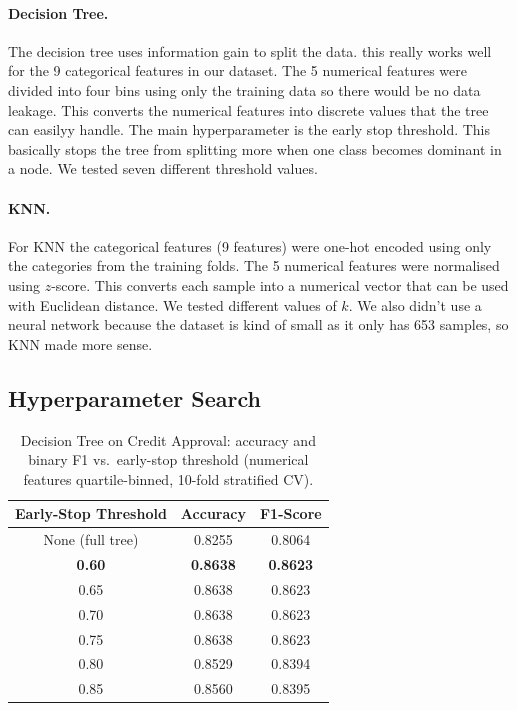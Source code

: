 \documentclass[11pt,letterpaper]{article}
\begin{document}
\paragraph{Decision Tree.}
The decision tree uses information gain to split the data. this really works well
for the 9 categorical features in our dataset. The 5 numerical features
were divided into four bins using only the training data so there would be
no data leakage. This converts the numerical features into discrete values
that the tree can easilyy handle. The main hyperparameter is the early stop
threshold. This basically  stops the tree from splitting more when one class becomes
dominant in a node. We tested seven different threshold values.

\paragraph{KNN.}
For KNN the categorical features (9 features) were one-hot encoded using only the
categories from the training folds. The 5 numerical features were
normalised using $z$-score. This converts each sample into a numerical vector that can be used with Euclidean distance. We tested
different values of $k$. We also didn't use a neural network because
the dataset is kind of small as it only has 653 samples, so KNN made more sense.

\subsection{Hyperparameter Search}

\begin{table}[ht]
\centering
\caption{Decision Tree on Credit Approval: accuracy and binary F1 vs.\
         early-stop threshold (numerical features quartile-binned,
         10-fold stratified CV).}
\label{tab:d4_dt}
\begin{tabular}{@{}ccc@{}}
\toprule
Early-Stop Threshold & Accuracy & F1-Score \\
\midrule
None (full tree) & 0.8255 & 0.8064 \\
\rowcolor{hilight}
\textbf{0.60} & \textbf{0.8638} & \textbf{0.8623} \\
0.65 & 0.8638 & 0.8623 \\
0.70 & 0.8638 & 0.8623 \\
0.75 & 0.8638 & 0.8623 \\
0.80 & 0.8529 & 0.8394 \\
0.85 & 0.8560 & 0.8395 \\
\bottomrule
\end{tabular}
\end{table}
\end{document}
